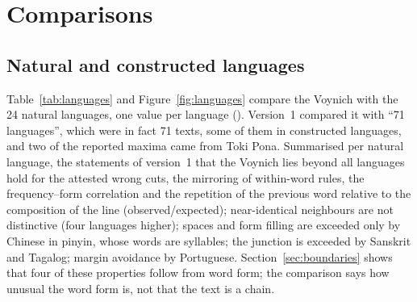 \section{Comparisons}
\label{sec:comparisons}

\subsection{Natural and constructed languages}

Table~\ref{tab:languages} and Figure~\ref{fig:languages} compare the Voynich with the 24 natural languages, one value
per language (). Version~1 compared it with ``71 languages'', which were in fact 71 texts, some of them in
constructed languages, and two of the reported maxima came from Toki Pona. Summarised per natural language, the
statements of version~1 that the Voynich lies beyond all languages hold for the attested wrong cuts, the mirroring of
within-word rules, the frequency--form correlation and the repetition of the previous word relative to the
composition of the line (observed/expected); near-identical neighbours are not distinctive (four languages higher); spaces and form filling are exceeded
only by Chinese in pinyin, whose words are syllables; the junction is exceeded by Sanskrit and Tagalog; margin avoidance
by Portuguese. Section~\ref{sec:boundaries} shows that four of these properties follow from word form; the comparison
says how unusual the word form is, not that the text is a chain.


